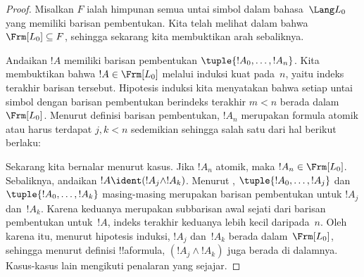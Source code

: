 \documentclass[../../../include/open-logic-section]{subfiles}
\begin{document}
\begin{proof}
Misalkan $F$ ialah himpunan semua untai simbol dalam bahasa~$\Lang L_0$ yang
memiliki barisan pembentukan. Kita telah melihat dalam
 bahwa $\Frm[L_0] \subseteq F$, sehingga
sekarang kita membuktikan arah sebaliknya.

Andaikan $!A$ memiliki barisan pembentukan $\tuple{!A_0,\dotsc,!A_n}$. Kita
membuktikan bahwa $!A \in \Frm[L_0]$ melalui induksi kuat pada~$n$, yaitu
indeks terakhir barisan tersebut. Hipotesis induksi kita menyatakan bahwa
setiap untai simbol dengan barisan pembentukan berindeks terakhir $m < n$
berada dalam~$\Frm[L_0]$. Menurut definisi barisan pembentukan, $!A_n$
merupakan formula atomik atau harus terdapat $j,k < n$ sedemikian sehingga
salah satu dari hal berikut berlaku:
\begin{enumerate}
\end{enumerate}
Sekarang kita bernalar menurut kasus. Jika $!A_n$ atomik, maka
$!A_n \in \Frm[L_0]$. Sebaliknya, andaikan $!A \ident
(!A_j \land !A_k)$. Menurut ,
$\tuple{!A_0,\dotsc,!A_j}$ dan $\tuple{!A_0,\dotsc,!A_k}$ masing-masing
merupakan barisan pembentukan untuk $!A_j$ dan~$!A_k$. Karena keduanya
merupakan subbarisan awal sejati dari barisan pembentukan untuk~$!A$, indeks
terakhir keduanya lebih kecil daripada~$n$. Oleh karena itu, menurut
hipotesis induksi, $!A_j$ dan~$!A_k$ berada dalam~$\Frm[L_0]$, sehingga
menurut definisi !!a{formula}, $(!A_j \land !A_k)$ juga berada di dalamnya.
Kasus-kasus lain mengikuti penalaran yang sejajar.
\end{proof}
\end{document}
